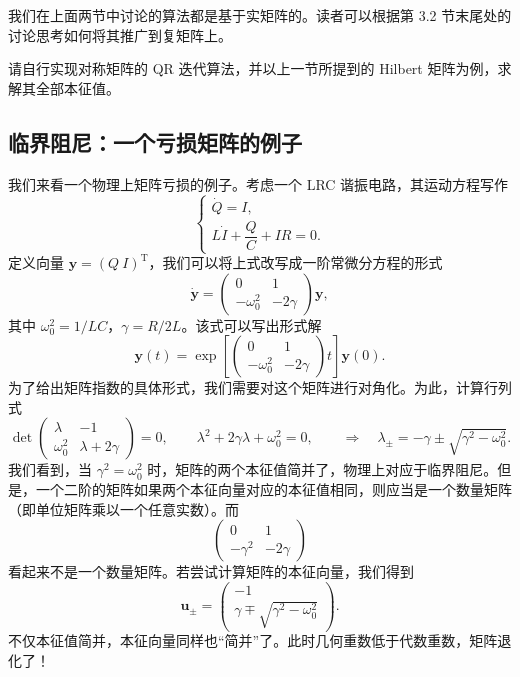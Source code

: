 我们在上面两节中讨论的算法都是基于实矩阵的。读者可以根据第 3.2 节末尾处的讨论思考如何将其推广到复矩阵上。

\begin{exerciseBox}[练习 3.3]
请自行实现对称矩阵的 QR 迭代算法，并以上一节所提到的 Hilbert 矩阵为例，求解其全部本征值。
\end{exerciseBox}

\subsection{临界阻尼：一个亏损矩阵的例子}

我们来看一个物理上矩阵亏损的例子。考虑一个 LRC 谐振电路，其运动方程写作
\begin{equation}
\begin{cases}
\dot Q=I,\\
L\dot I+\dfrac{Q}{C}+IR=0.
\end{cases}
\tag{3.4.34}
\end{equation}
定义向量 $\bm y=(Q\ I)^{\mathrm T}$，我们可以将上式改写成一阶常微分方程的形式
\begin{equation}
\dot{\bm y}=\begin{pmatrix}0&1\\-\omega_0^2&-2\gamma\end{pmatrix}\bm y,
\tag{3.4.35}
\end{equation}
其中 $\omega_0^2=1/LC$，$\gamma=R/2L$。该式可以写出形式解
\begin{equation}
\bm y(t)=\exp\!\left[\begin{pmatrix}0&1\\-\omega_0^2&-2\gamma\end{pmatrix}t\right]\bm y(0).
\tag{3.4.36}
\end{equation}
为了给出矩阵指数的具体形式，我们需要对这个矩阵进行对角化。为此，计算行列式
\begin{equation}
\det\begin{pmatrix}\lambda&-1\\\omega_0^2&\lambda+2\gamma\end{pmatrix}=0,
\qquad
\lambda^2+2\gamma\lambda+\omega_0^2=0,
\qquad
\Longrightarrow\quad \lambda_{\pm}=-\gamma\pm\sqrt{\gamma^2-\omega_0^2}.
\tag{3.4.37}
\end{equation}
我们看到，当 $\gamma^2=\omega_0^2$ 时，矩阵的两个本征值简并了，物理上对应于临界阻尼。但是，一个二阶的矩阵如果两个本征向量对应的本征值相同，则应当是一个数量矩阵（即单位矩阵乘以一个任意实数）。而
\begin{equation}
\begin{pmatrix}0&1\\-\gamma^2&-2\gamma\end{pmatrix}
\tag{3.4.38}
\end{equation}
看起来不是一个数量矩阵。若尝试计算矩阵的本征向量，我们得到
\begin{equation}
\bm u_{\pm}=\begin{pmatrix}-1\\\gamma\mp\sqrt{\gamma^2-\omega_0^2}\end{pmatrix}.
\tag{3.4.39}
\end{equation}
不仅本征值简并，本征向量同样也“简并”了。此时几何重数低于代数重数，矩阵退化了！

